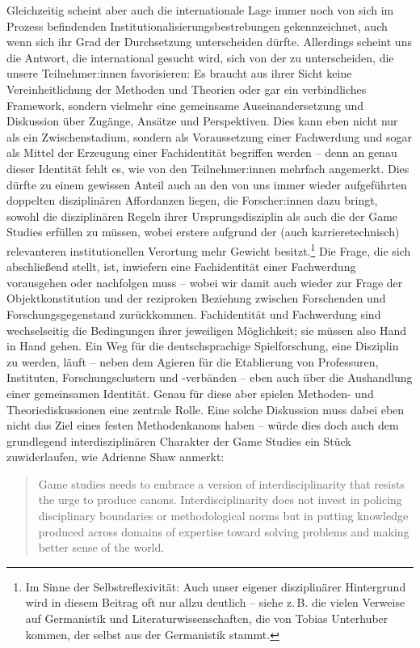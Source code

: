 \documentclass{scrartcl}
\begin{document}
Gleichzeitig scheint aber auch die internationale Lage immer noch von sich im Prozess befindenden Institutionalisierungsbestrebungen gekennzeichnet, auch wenn sich ihr Grad der Durchsetzung unterscheiden dürfte.
Allerdings scheint uns die Antwort, die international gesucht wird, sich von der zu unterscheiden, die unsere Teilnehmer:innen favorisieren:
Es braucht aus ihrer Sicht keine Vereinheitlichung der Methoden und Theorien oder gar ein verbindliches Framework, sondern vielmehr eine gemeinsame Auseinandersetzung und Diskussion über Zugänge, Ansätze und Perspektiven.
Dies kann eben nicht nur als ein Zwischenstadium, sondern als Voraussetzung einer Fachwerdung und sogar als Mittel der Erzeugung einer Fachidentität begriffen werden -- denn an genau dieser Identität fehlt es, wie von den Teilnehmer:innen mehrfach angemerkt.
Dies dürfte zu einem gewissen Anteil auch an den von uns immer wieder aufgeführten doppelten disziplinären Affordanzen liegen, die Forscher:innen dazu bringt, sowohl die disziplinären Regeln ihrer Ursprungsdisziplin als auch die der Game Studies erfüllen zu müssen, wobei erstere aufgrund der (auch karrieretechnisch) relevanteren institutionellen Verortung mehr Gewicht besitzt.\footnote{Im Sinne der Selbstreflexivität: Auch unser eigener disziplinärer Hintergrund wird in diesem Beitrag oft nur allzu deutlich -- siehe z.\,B. die vielen Verweise auf Germanistik und Literaturwissenschaften, die von Tobias Unterhuber kommen, der selbst aus der Germanistik stammt.}
Die Frage, die sich abschließend stellt, ist, inwiefern eine Fachidentität einer Fachwerdung vorausgehen oder nachfolgen muss -- wobei wir damit auch wieder zur Frage der Objektkonstitution und der reziproken Beziehung zwischen Forschenden und Forschungsgegenstand zurückkommen.
Fachidentität und Fachwerdung sind wechselseitig die Bedingungen ihrer jeweiligen Möglichkeit; sie müssen also Hand in Hand gehen.
Ein Weg für die deutschsprachige Spielforschung, eine Disziplin zu werden, läuft -- neben dem Agieren für die Etablierung von Professuren, Instituten, Forschungsclustern und -verbänden -- eben auch über die Aushandlung einer gemeinsamen Identität.
Genau für diese aber spielen Methoden- und Theoriediskussionen eine zentrale Rolle.
Eine solche Diskussion muss dabei eben nicht das Ziel eines festen Methodenkanons haben -- würde dies doch auch dem grundlegend interdisziplinären Charakter der Game Studies ein Stück zuwiderlaufen, wie Adrienne Shaw anmerkt:

\begin{quote}
   Game studies needs to embrace a version of interdisciplinarity that resists the urge to produce canons.
   Interdisciplinarity does not invest in policing disciplinary boundaries or methodological norms but in putting knowledge produced across domains of expertise toward solving problems and making better sense of the world.\autocite[][S.~625]{shaw_is_2025}
\end{quote}
\end{document}
